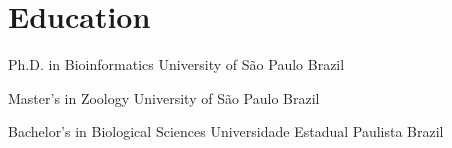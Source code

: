 
\section{Education}

		{Ph.D. in Bioinformatics}
		{University of São Paulo}
		{Brazil}
		{}{}

		{Master's in Zoology}
		{University of São Paulo}
		{Brazil}
		{}{}
	
		{Bachelor's in Biological Sciences}
		{Universidade Estadual Paulista}
		{Brazil}
		{}{}